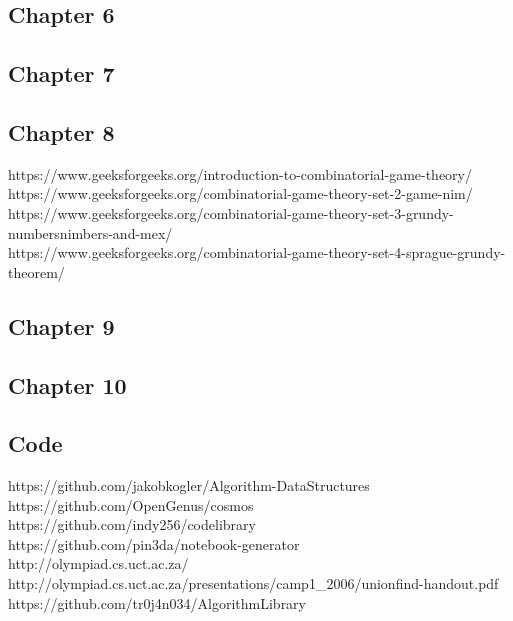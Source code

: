 \subsection{Chapter 6}


\subsection{Chapter 7}


\subsection{Chapter 8}
https://www.geeksforgeeks.org/introduction-to-combinatorial-game-theory/ \\
https://www.geeksforgeeks.org/combinatorial-game-theory-set-2-game-nim/ \\
https://www.geeksforgeeks.org/combinatorial-game-theory-set-3-grundy-numbersnimbers-and-mex/ \\
https://www.geeksforgeeks.org/combinatorial-game-theory-set-4-sprague-grundy-theorem/ \\

\subsection{Chapter 9}


\subsection{Chapter 10}


\subsection{Code}
https://github.com/jakobkogler/Algorithm-DataStructures \\
https://github.com/OpenGenus/cosmos \\
https://github.com/indy256/codelibrary \\
https://github.com/pin3da/notebook-generator \\
http://olympiad.cs.uct.ac.za/ \\
http://olympiad.cs.uct.ac.za/presentations/camp1\_2006/unionfind-handout.pdf \\
https://github.com/tr0j4n034/AlgorithmLibrary \\
